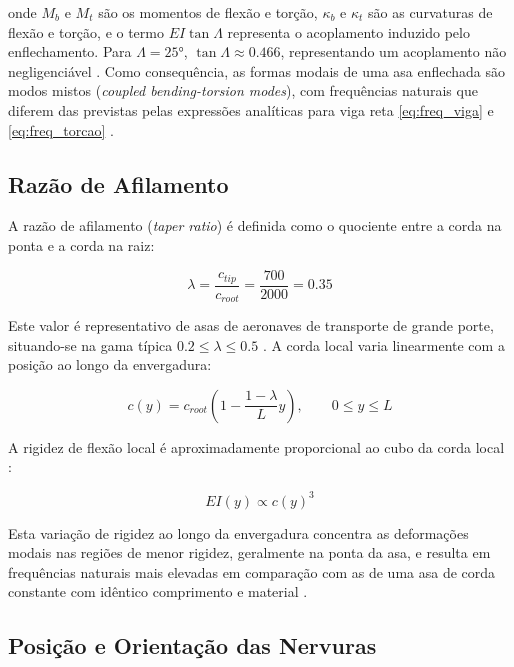 \documentclass[11pt,oneside,a4paper,final]{report}
\begin{document}
\noindent onde $M_b$ e $M_t$ são os momentos de flexão e torção, $\kappa_b$ e $\kappa_t$ são as curvaturas de flexão e torção, e o termo $EI\tan\Lambda$ representa o acoplamento induzido pelo enflechamento. Para $\Lambda = \ang{25}$, $\tan\Lambda \approx 0.466$, representando um acoplamento não negligenciável \cite{Bisplinghoff1996}. Como consequência, as formas modais de uma asa enflechada são modos mistos (\textit{coupled bending-torsion modes}), com frequências naturais que diferem das previstas pelas expressões analíticas para viga reta \eqref{eq:freq_viga} e \eqref{eq:freq_torcao} \cite{Wright2015}.

\subsection{Razão de Afilamento}

A razão de afilamento (\textit{taper ratio}) é definida como o quociente entre a corda na ponta e a corda na raiz:

\begin{equation}
    \lambda = \frac{c_{tip}}{c_{root}} = 
    \frac{700}{2000} = 0.35
    \label{eq:taper_ratio}
\end{equation}

Este valor é representativo de asas de aeronaves de transporte de grande porte, situando-se na gama típica $0.2 \leq \lambda \leq 0.5$ \cite{Raymer2018}. A corda local varia linearmente com a posição ao longo da envergadura:

\begin{equation}
    c(y) = c_{root}\left(1 - 
    \frac{1-\lambda}{L}y\right), \qquad 0 \leq y \leq L
    \label{eq:corda_local}
\end{equation}

A rigidez de flexão local é aproximadamente proporcional ao cubo da corda local \cite{Megson2012}:

\begin{equation}
    EI(y) \propto c(y)^3
    \label{eq:EI_local}
\end{equation}

Esta variação de rigidez ao longo da envergadura concentra as deformações modais nas regiões de menor rigidez, geralmente na ponta da asa, e resulta em frequências naturais mais elevadas em comparação com as de uma asa de corda constante com idêntico comprimento e material \cite{Rao2011}.

\subsection{Posição e Orientação das Nervuras}
\end{document}

